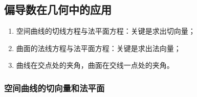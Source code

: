 \documentclass[UTF8]{ctexart}
\begin{document}
    \subsection{偏导数在几何中的应用}
    \begin{enumerate}
        \item 空间曲线的切线方程与法平面方程：关键是求出切向量；
        \item 曲面的法线方程与法平面方程：关键是求出法向量；
        \item 曲线在交点处的夹角，曲面在交线一点处的夹角。
    \end{enumerate}

    \subsubsection{空间曲线的切向量和法平面}
\end{document}
